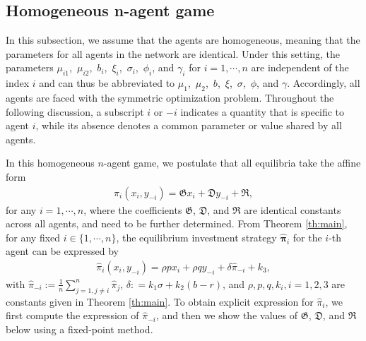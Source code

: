 \documentclass[11pt]{article}
\numberwithin{equation}{section}
\providecommand{\smn}{{-}} %
\begin{document}
\subsection{Homogeneous n-agent game}\label{sec:homogenous case}
In this subsection, we assume that the agents are homogeneous, meaning that the parameters for all agents in the network are identical. 	Under this setting, the parameters \(\mu_{i1}\),~\(\mu_{i2}\),~\(b_i\),~\(\xi_i\),~\(\sigma_i\),~\(\phi_i\), and \(\gamma_i\) for \(i=1,\cdots,n\) are independent of the index  \(i\) and can thus be abbreviated to \(\mu_{1}\),~\(\mu_{2}\),~\(b\),~\(\xi\),~\(\sigma\),~\(\phi\), and \(\gamma\). Accordingly, all agents are faced with the symmetric optimization problem.  Throughout the following discussion, a subscript \(i\) or \(-i\) indicates a quantity that is specific to agent \(i\), while its absence denotes a common parameter or value shared by all agents.

 In this homogeneous \(n\)-agent game, we postulate that all equilibria take the affine form
 \begin{align}\label{eq:PQRpi}
 	\widehat{\pi}_i(x_i,y_{\smn i}) = \mathfrak{G}x_i + \mathfrak{D}y_{-i} + \mathfrak{R},
 \end{align}
 for any \(i=1,\cdots,n\), where the coefficients \(\mathfrak{G}\), \(\mathfrak{D}\), and \(\mathfrak{R}\) are identical constants across all agents, and need to be further determined. From Theorem \ref{th:main}, for any fixed $i \in \{1,\cdots,n\}$, the equilibrium investment strategy \(\hat{\bm{\pi}}_i\) for the \(i\)-th agent can be expressed by
  \begin{align}\label{eq:pifinalH}
  	\widehat{\pi}_i(x_i,y_{\smn i}) = \rho px_i + \rho qy_{-i} + \delta \widehat{{\pi}}_{-i} + k_3,
  \end{align}
with \(\widehat{{\pi}}_{-i}:=\frac{1}{n}\sum^n_{j=1, j\neq i}\widehat{\pi}_j\), $\delta : = k_{1}\sigma + k_2{(b-r)}$, and $\rho, p, q, k_i, i=1,2,3$ are constants given in Theorem \ref{th:main}. To obtain explicit expression for \(\widehat{\pi}_i\), we first compute the expression of  \(\widehat{{\pi}}_{-i}\), and then we show the values of \(\mathfrak{G}\), \(\mathfrak{D}\), and \(\mathfrak{R}\) below using a fixed-point method.
\end{document}
